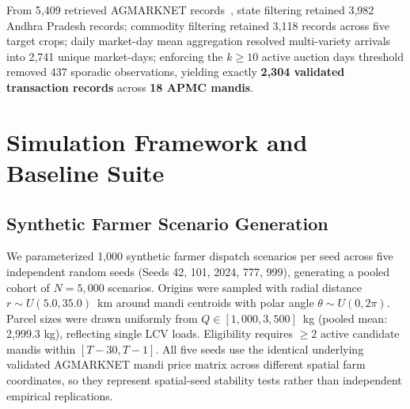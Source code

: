 \documentclass[journal]{IEEEtran}
\begin{document}
From 5,409 retrieved AGMARKNET records~\cite{agmarknet2024}, state filtering retained 3,982 Andhra Pradesh records; commodity filtering retained 3,118 records across five target crops; daily market-day mean aggregation resolved multi-variety arrivals into 2,741 unique market-days; enforcing the $k \ge 10$ active auction days threshold removed 437 sporadic observations, yielding exactly \textbf{2,304 validated transaction records} across \textbf{18 APMC mandis}.

\section{Simulation Framework and Baseline Suite}
\subsection{Synthetic Farmer Scenario Generation}
We parameterized 1,000 synthetic farmer dispatch scenarios per seed across five independent random seeds (Seeds 42, 101, 2024, 777, 999), generating a pooled cohort of $N = 5,000$ scenarios. Origins were sampled with radial distance $r \sim U(5.0, 35.0)$~km around mandi centroids with polar angle $\theta \sim U(0, 2\pi)$. Parcel sizes were drawn uniformly from $Q \in [1,000, 3,500]$~kg (pooled mean: 2,999.3 kg), reflecting single LCV loads. Eligibility requires $\ge 2$ active candidate mandis within $[T-30, T-1]$. All five seeds use the identical underlying validated AGMARKNET mandi price matrix across different spatial farm coordinates, so they represent spatial-seed stability tests rather than independent empirical replications.
\end{document}
